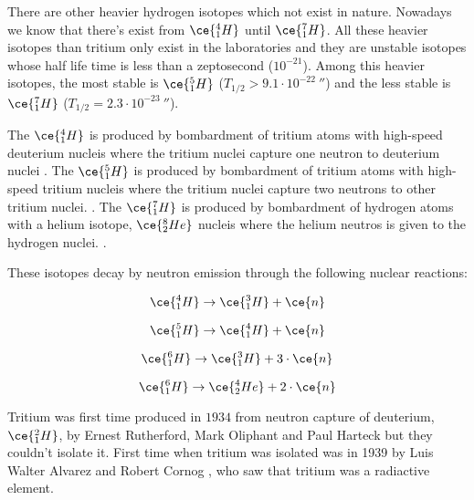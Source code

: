 There are other heavier hydrogen isotopes which not exist in nature. Nowadays we know that there's exist from $\ce{^{4}_{1}H}$ until $\ce{^{7}_{1}H}$. All these heavier isotopes than tritium only exist in the laboratories and they are unstable isotopes whose half life time is less than a zeptosecond ($10^{-21}$). Among this heavier isotopes, the most stable is $\ce{^{5}_{1}H}$ ($T_{1/2} > 9.1\cdot 10^{-22}~\second$)\cite{wikipediaAnexoIsotoposDeHidrogeno} and the less stable is $\ce{^{7}_{1}H}$ ($T_{1/2} = 2.3 \cdot 10^{-23} ~\second$)\cite{wikipediaAnexoIsotoposDeHidrogeno}. 

The $\ce{^{4}_{1}H}$ is produced by bombardment of tritium atoms with high-speed deuterium nucleis \cite{asdfasd} where the tritium nuclei capture one neutron to deuterium nuclei \cite{asdfasdf}. The $\ce{^{5}_{1}H}$ is produced by bombardment of tritium atoms with high-speed tritium nucleis where the tritium nuclei capture two neutrons to other tritium nuclei. \cite{asdfasd}. The $\ce{^{7}_{1}H}$ is produced by bombardment of hydrogen atoms with a helium isotope, $\ce{^{8}_{2}He}$ nucleis where the helium neutros is given to the hydrogen nuclei. \cite{asdfasd}. 

These isotopes decay by neutron emission through the following nuclear reactions:

\begin{equation}
\ce{^{4}_{1}H} \rightarrow \ce{^{3}_{1}H} + \ce{n}
\label{H4}
\end{equation}

\begin{equation}
\ce{^{5}_{1}H} \rightarrow \ce{^{4}_{1}H} + \ce{n}
\label{H5}
\end{equation}

\begin{equation}
\ce{^{6}_{1}H} \rightarrow \ce{^{3}_{1}H} + 3 \cdot \ce{n}
\label{H6}
\end{equation}

\begin{equation}
\ce{^{6}_{1}H} \rightarrow \ce{^{4}_{2}He} + 2 \cdot \ce{n}
\label{H62}
\end{equation}

Tritium was first time produced in $1934$ from neutron capture of deuterium, $\ce{^{2}_{1}H}$, by Ernest Rutherford, Mark Oliphant and Paul Harteck \cite{TritiumDiscovery} but they couldn't isolate it. First time when tritium was isolated was in 1939 by Luis Walter Alvarez and Robert Cornog \cite{TritiumIsolate}, who saw that tritium was a radiactive element. 


